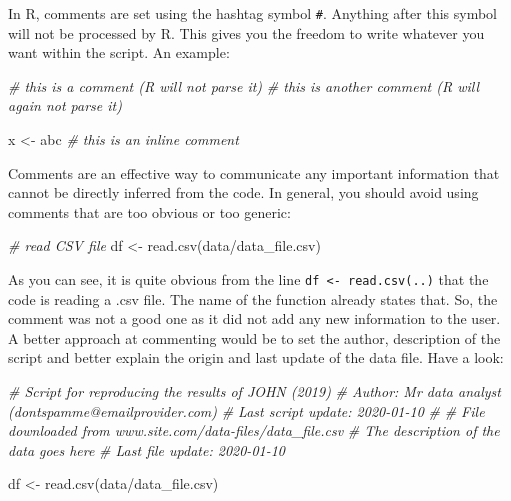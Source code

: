 \documentclass[
  12pt,
]{book}
\newenvironment{Shaded}{\begin{snugshade}}{\end{snugshade}}
\newcommand{\CommentTok}[1]{\textcolor[rgb]{0.37,0.37,0.37}{\textit{#1}}}
\newcommand{\FunctionTok}[1]{\textcolor[rgb]{0,0,0}{#1}}
\newcommand{\NormalTok}[1]{#1}
\newcommand{\OtherTok}[1]{\textcolor[rgb]{0.37,0.37,0.37}{#1}}
\newcommand{\StringTok}[1]{\textcolor[rgb]{0.5,0.5,0.5}{#1}}
\begin{document}
In R, comments are set using the hashtag symbol \texttt{\#}. Anything after this symbol will not be processed by R. This gives you the freedom to write whatever you want within the script. An example:

\begin{Shaded}
\begin{Highlighting}[]
\CommentTok{\# this is a comment (R will not parse it)}
\CommentTok{\# this is another comment (R will again not parse it)}

\NormalTok{x }\OtherTok{\textless{}{-}} \StringTok{\textquotesingle{}abc\textquotesingle{}} \CommentTok{\# this is an inline comment}
\end{Highlighting}
\end{Shaded}

Comments are an effective way to communicate any important information that cannot be directly inferred from the code. In general, you should avoid using comments that are too obvious or too generic:

\begin{Shaded}
\begin{Highlighting}[]
\CommentTok{\# read CSV file}
\NormalTok{df }\OtherTok{\textless{}{-}} \FunctionTok{read.csv}\NormalTok{(}\StringTok{\textquotesingle{}data/data\_file.csv\textquotesingle{}}\NormalTok{)}
\end{Highlighting}
\end{Shaded}

As you can see, it is quite obvious from the line \texttt{df\ \textless{}-\ read.csv(\textquotesingle{}..\textquotesingle{})} that the code is reading a .csv file. The name of the function already states that. So, the comment was not a good one as it did not add any new information to the user. A better approach at commenting would be to set the author, description of the script and better explain the origin and last update of the data file. Have a look:

\begin{Shaded}
\begin{Highlighting}[]
\CommentTok{\# Script for reproducing the results of JOHN (2019)}
\CommentTok{\# Author: Mr data analyst (dontspamme@emailprovider.com)}
\CommentTok{\# Last script update: 2020{-}01{-}10}
\CommentTok{\#}
\CommentTok{\# File downloaded from www.site.com/data{-}files/data\_file.csv}
\CommentTok{\# The description of the data goes here}
\CommentTok{\# Last file update: 2020{-}01{-}10}

\NormalTok{df }\OtherTok{\textless{}{-}} \FunctionTok{read.csv}\NormalTok{(}\StringTok{\textquotesingle{}data/data\_file.csv\textquotesingle{}}\NormalTok{)}
\end{Highlighting}
\end{Shaded}
\end{document}
